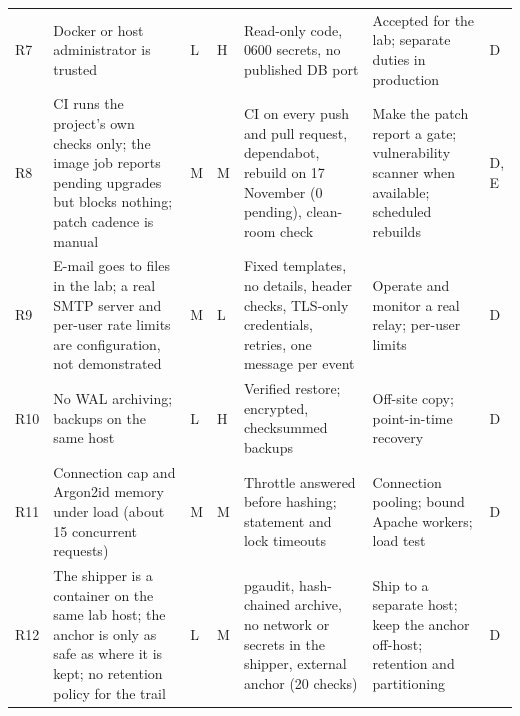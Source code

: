 \documentclass[10pt,a4paper]{article}
\begin{document}
\begin{center}
\begin{longtable}{@{}L{0.6cm}L{3.6cm}L{0.7cm}L{0.7cm}L{4.4cm}L{4.4cm}L{0.9cm}@{}}
R7 & Docker or host administrator is trusted & L & H & Read-only code, 0600 secrets, no published DB port & Accepted for the lab; separate duties in production & D\\
R8 & CI runs the project's own checks only; the image job reports pending upgrades but blocks nothing; patch cadence is manual & M & M & CI on every push and pull request, dependabot, rebuild on 17 November (0 pending), clean-room check & Make the patch report a gate; vulnerability scanner when available; scheduled rebuilds & D, E\\
R9 & E-mail goes to files in the lab; a real SMTP server and per-user rate limits are configuration, not demonstrated & M & L & Fixed templates, no details, header checks, TLS-only credentials, retries, one message per event & Operate and monitor a real relay; per-user limits & D\\
R10 & No WAL archiving; backups on the same host & L & H & Verified restore; encrypted, checksummed backups & Off-site copy; point-in-time recovery & D\\
R11 & Connection cap and Argon2id memory under load (about 15 concurrent requests) & M & M & Throttle answered before hashing; statement and lock timeouts & Connection pooling; bound Apache workers; load test & D\\
R12 & The shipper is a container on the same lab host; the anchor is only as safe as where it is kept; no retention policy for the trail & L & M & pgaudit, hash-chained archive, no network or secrets in the shipper, external anchor (20 checks) & Ship to a separate host; keep the anchor off-host; retention and partitioning & D\\
\bottomrule\end{longtable}\end{center}
\end{document}
